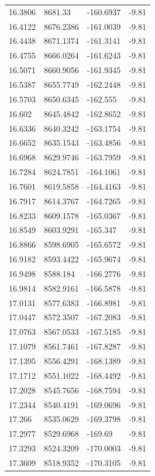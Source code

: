 \begin{table}[H]
\begin{tabular}{llll}
16.3806 & 8681.33 & -160.6937 & -9.81 \\
16.4122 & 8676.2386 & -161.0039 & -9.81 \\
16.4438 & 8671.1374 & -161.3141 & -9.81 \\
16.4755 & 8666.0264 & -161.6243 & -9.81 \\
16.5071 & 8660.9056 & -161.9345 & -9.81 \\
16.5387 & 8655.7749 & -162.2448 & -9.81 \\
16.5703 & 8650.6345 & -162.555 & -9.81 \\
16.602 & 8645.4842 & -162.8652 & -9.81 \\
16.6336 & 8640.3242 & -163.1754 & -9.81 \\
16.6652 & 8635.1543 & -163.4856 & -9.81 \\
16.6968 & 8629.9746 & -163.7959 & -9.81 \\
16.7284 & 8624.7851 & -164.1061 & -9.81 \\
16.7601 & 8619.5858 & -164.4163 & -9.81 \\
16.7917 & 8614.3767 & -164.7265 & -9.81 \\
16.8233 & 8609.1578 & -165.0367 & -9.81 \\
16.8549 & 8603.9291 & -165.347 & -9.81 \\
16.8866 & 8598.6905 & -165.6572 & -9.81 \\
16.9182 & 8593.4422 & -165.9674 & -9.81 \\
16.9498 & 8588.184 & -166.2776 & -9.81 \\
16.9814 & 8582.9161 & -166.5878 & -9.81 \\
17.0131 & 8577.6383 & -166.8981 & -9.81 \\
17.0447 & 8572.3507 & -167.2083 & -9.81 \\
17.0763 & 8567.0533 & -167.5185 & -9.81 \\
17.1079 & 8561.7461 & -167.8287 & -9.81 \\
17.1395 & 8556.4291 & -168.1389 & -9.81 \\
17.1712 & 8551.1022 & -168.4492 & -9.81 \\
17.2028 & 8545.7656 & -168.7594 & -9.81 \\
17.2344 & 8540.4191 & -169.0696 & -9.81 \\
17.266 & 8535.0629 & -169.3798 & -9.81 \\
17.2977 & 8529.6968 & -169.69 & -9.81 \\
17.3293 & 8524.3209 & -170.0003 & -9.81 \\
17.3609 & 8518.9352 & -170.3105 & -9.81 \\

\end{tabular}
\end{table}
